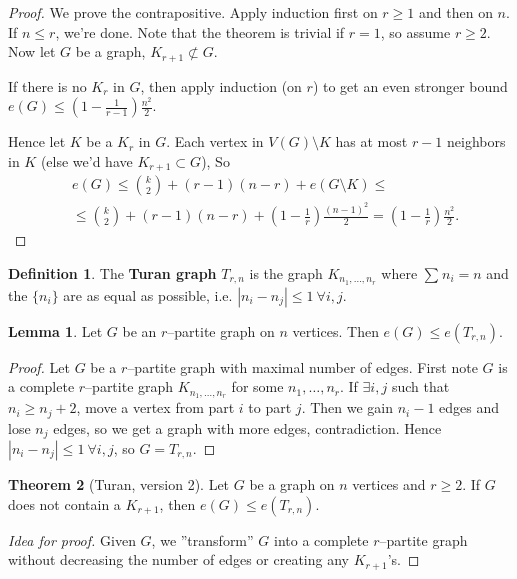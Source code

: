 \documentclass{article}
\theoremstyle{definition}
\newtheorem{theorem}{Theorem}[section]
\newtheorem{lemma}[theorem]{Lemma}
\newtheorem{defn}{Definition}[section]
\begin{document}
\begin{proof}
    We prove the contrapositive. Apply induction first on $r\ge 1$ and then on $n$. If $n\le r$, we're done. Note that the theorem is trivial if $r=1$, so assume $r\ge 2$. Now let $G$ be a graph, $K_{r+1} \not\subset G$.

    If there is no $K_r$ in $G$, then apply induction (on $r$) to get an even stronger bound $e(G) \le (1-\frac{1}{r-1})\frac{n^2}{2}$.
    \vspace{1mm}
    
    Hence let $K$ be a $K_r$ in $G$. Each vertex in $V(G)\setminus K$ has at most $r-1$ neighbors in $K$ (else we'd have $K_{r+1} \subset G$), So
    \begin{align*}
        &e(G) \le {{k}\choose{2}} + (r-1)(n-r) + e(G\setminus K) \le \\
        &\le {{k}\choose{2}} + (r-1)(n-r) + \left(1-\frac{1}{r}\right)\frac{(n-1)^2}{2} = \left(1-\frac{1}{r}\right)\frac{n^2}{2}.
    \end{align*}
\end{proof}
\begin{defn}
    The \textbf{Turan graph} $T_{r,n}$ is the graph $K_{n_1,\ldots,n_r}$ where $\sum_{}^{} n_i=n$ and the $\{n_i\}$ are as equal as possible, i.e. $|n_i-n_j|\le 1 ~\forall i,j$.
\end{defn}
\begin{lemma}\label{4.6}
    Let $G$ be an $r$--partite graph on $n$ vertices. Then $e(G) \le e(T_{r,n})$.
\end{lemma}
\begin{proof}
    Let $G$ be a $r$--partite graph with maximal number of edges. First note $G$ is a complete $r$--partite graph $K_{n_1,\ldots,n_r}$ for some $n_1,\ldots,n_r$. If $\exists i,j$ such that $n_i \ge n_j +2$, move a vertex from part $i$ to part $j$. Then we gain $n_i-1$ edges and lose $n_j$ edges, so we get a graph with more edges, contradiction. Hence $|n_i-n_j|\le 1 ~\forall i,j$, so $G=T_{r,n}$.
\end{proof}
\begin{theorem}[Turan, version 2]
    Let $G$ be a graph on $n$ vertices and $r\ge 2$. If $G$ does not contain a $K_{r+1}$, then $e(G) \le e(T_{r,n})$.
\end{theorem}
\begin{proof}[Idea for proof]
    Given $G$, we ''transform'' $G$ into a complete $r$--partite graph without decreasing the number of edges or creating any $K_{r+1}$'s.
\end{proof}
\end{document}
